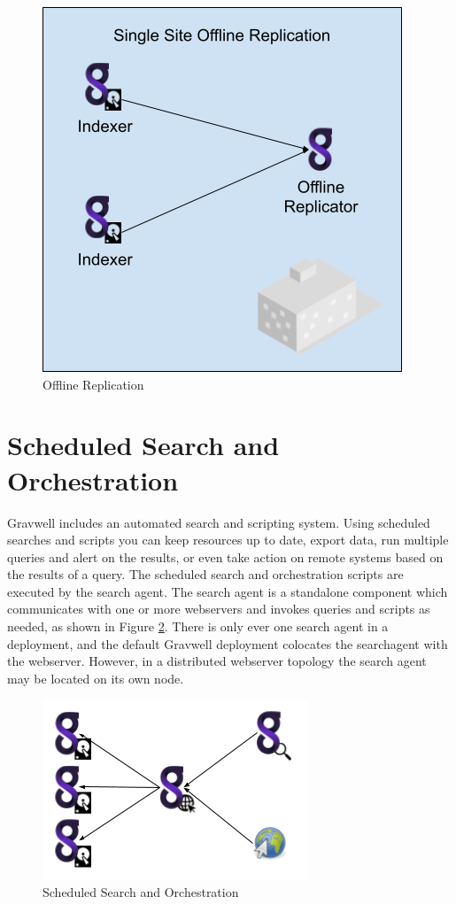 {\begin{figure}[H]
	\includegraphics[width=0.6\linewidth]{images/offlinereplication.png}
	\caption{Offline Replication}
	\label{fig:offlinereplication}
\end{figure}

\section{Scheduled Search and Orchestration}

Gravwell includes an automated search and scripting system. Using
scheduled searches and scripts you can keep resources up to date, export
data, run multiple queries and alert on the results, or even take action
on remote systems based on the results of a query. The scheduled search
and orchestration scripts are executed by the search agent. The search agent
is a standalone component which communicates with one or more webservers
and invokes queries and scripts as needed, as shown in Figure \ref{fig:scheduledsearch}. 
There is only ever one
search agent in a deployment, and the default Gravwell deployment
colocates the searchagent with the webserver. However, in a distributed
webserver topology the search agent may be located on its own node.

\begin{figure}[H]
	\includegraphics[width=0.6\linewidth]{images/soar.png}
	\caption{Scheduled Search and Orchestration}
	\label{fig:scheduledsearch}
\end{figure}

}
